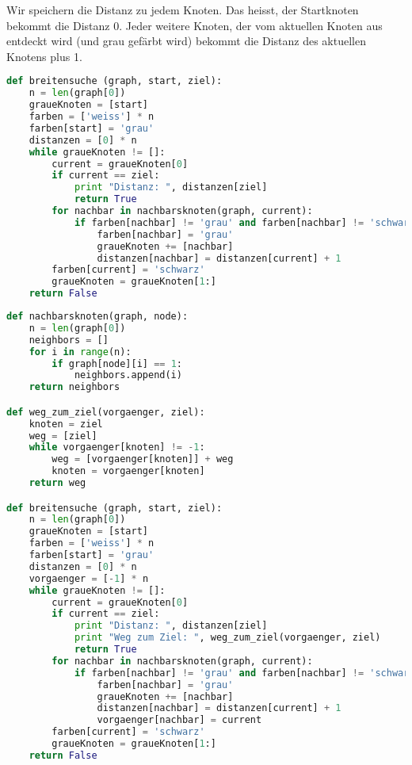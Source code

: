 \begin{lsg}
Wir speichern die Distanz zu jedem Knoten. Das heisst, der Startknoten bekommt die Distanz 0. Jeder weitere Knoten, der vom aktuellen Knoten aus entdeckt wird (und grau gef\"arbt wird) bekommt die Distanz des aktuellen Knotens plus 1.
\end{lsg}

\begin{lsg}
\hfill
\begin{lstlisting}[language=Python,basicstyle=\small,tabsize=3]
def breitensuche (graph, start, ziel):
	n = len(graph[0])
	graueKnoten = [start]
	farben = ['weiss'] * n
	farben[start] = 'grau'
	distanzen = [0] * n
	while graueKnoten != []:
		current = graueKnoten[0]
		if current == ziel:
			print "Distanz: ", distanzen[ziel]
			return True
		for nachbar in nachbarsknoten(graph, current):
			if farben[nachbar] != 'grau' and farben[nachbar] != 'schwarz':
				farben[nachbar] = 'grau'
				graueKnoten += [nachbar]
				distanzen[nachbar] = distanzen[current] + 1
		farben[current] = 'schwarz'
		graueKnoten = graueKnoten[1:]
	return False
\end{lstlisting}
\end{lsg}

\begin{lsg}
\hfill
\begin{lstlisting}[language=Python,basicstyle=\small,tabsize=3]
def nachbarsknoten(graph, node):
	n = len(graph[0])
	neighbors = []
	for i in range(n):
		if graph[node][i] == 1:
			neighbors.append(i)
	return neighbors

def weg_zum_ziel(vorgaenger, ziel):
	knoten = ziel
	weg = [ziel]	
	while vorgaenger[knoten] != -1:
		weg = [vorgaenger[knoten]] + weg
		knoten = vorgaenger[knoten]
	return weg

def breitensuche (graph, start, ziel):
	n = len(graph[0])
	graueKnoten = [start]
	farben = ['weiss'] * n
	farben[start] = 'grau'
	distanzen = [0] * n
	vorgaenger = [-1] * n
	while graueKnoten != []:
		current = graueKnoten[0]
		if current == ziel:
			print "Distanz: ", distanzen[ziel]
			print "Weg zum Ziel: ", weg_zum_ziel(vorgaenger, ziel)
			return True
		for nachbar in nachbarsknoten(graph, current):
			if farben[nachbar] != 'grau' and farben[nachbar] != 'schwarz':
				farben[nachbar] = 'grau'
				graueKnoten += [nachbar]
				distanzen[nachbar] = distanzen[current] + 1
				vorgaenger[nachbar] = current
		farben[current] = 'schwarz'
		graueKnoten = graueKnoten[1:]
	return False
\end{lstlisting}
\end{lsg}

